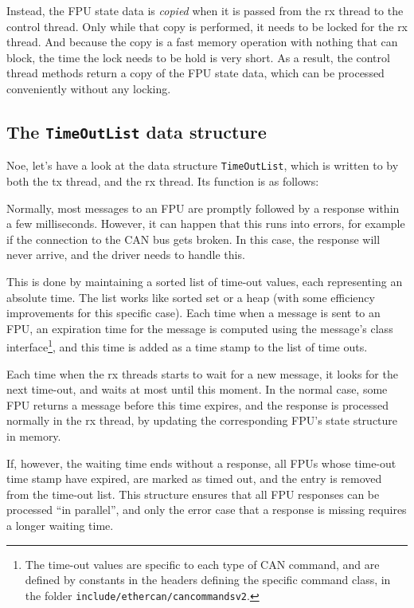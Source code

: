 \documentclass[fontsize=12,a4paper]{scrartcl}
\begin{document}
Instead, the FPU state data is \emph{copied} when it is passed from
the rx thread to the control thread. Only while that copy is
performed, it needs to be locked for the rx thread. And because the
copy is a fast memory operation with nothing that can block, the time
the lock needs to be hold is very short. As a result, the control
thread methods return a copy of the FPU state data, which can be
processed conveniently without any locking.

\subsection{The \texttt{TimeOutList} data structure}

Noe, let's have a look at the data structure \texttt{TimeOutList},
which is written to by both the tx thread, and the rx thread. Its
function is as follows:

Normally, most messages to an FPU are promptly followed by a response
within a few milliseconds. However, it can happen that this runs into
errors, for example if the connection to the CAN bus gets broken. In
this case, the response will never arrive, and the driver needs to
handle this.

This is done by maintaining a sorted list of time-out values, each
representing an absolute time. The list works like sorted set or a
heap (with some efficiency improvements for this specific case). Each
time when a message is sent to an FPU, an expiration time for the
message is computed using the message's class interface\footnote{The
  time-out values are specific to each type of CAN command, and are
  defined by constants in the headers defining the specific command
  class, in the folder \texttt{include/ethercan/cancommandsv2}.}, and
this time is added as a time stamp to the list of time outs.

Each time when the rx threads starts to wait for a new message, it
looks for the next time-out, and waits at most until this moment.  In
the normal case, some FPU returns a message before this time expires,
and the response is processed normally in the rx thread, by updating
the corresponding FPU's state structure in memory.

If, however, the waiting time ends without a response, all FPUs whose
time-out time stamp have expired, are marked as timed out, and the
entry is removed from the time-out list.  This structure ensures that
all FPU responses can be processed ``in parallel'', and only the error
case that a response is missing requires a longer waiting time.
\end{document}
